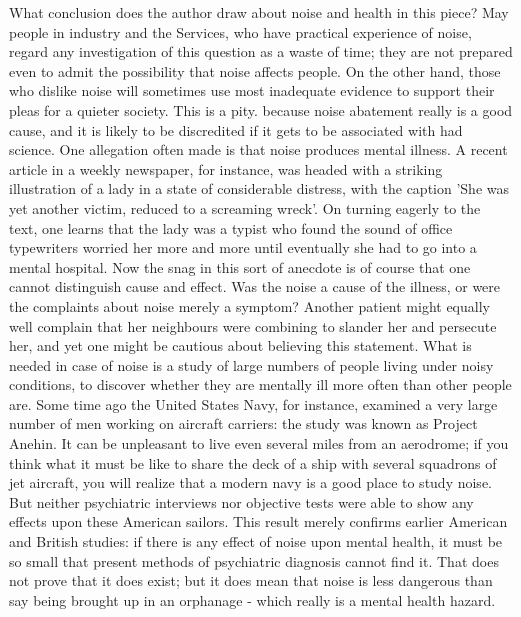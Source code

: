 \begin{enumerate}
What conclusion does the author draw about noise and health in this piece? May people in industry and the Services, who have practical experience of noise, regard any investigation of this question as a waste of time; they are not prepared even to admit the possibility that noise affects people.
 On the other hand, those who dislike noise will sometimes use most inadequate evidence to support their pleas for a quieter society.
 This is a pity. because noise abatement really is a good cause, and it is likely to be discredited if it gets to be associated with had science.
One allegation often made is that noise produces mental illness.
 A recent article in a weekly newspaper, for instance, was headed with a striking illustration of a lady in a state of considerable distress, with the caption 'She was yet another victim, reduced to a screaming wreck'.
 On turning eagerly to the text, one learns that the lady was a typist who found the sound of office typewriters worried her more and more until eventually she had to go into a mental hospital.
 Now the snag in this sort of anecdote is of course that one cannot distinguish cause and effect. Was the noise a cause of the illness, or were the complaints about noise merely a symptom? Another patient might equally well complain that her neighbours were combining to slander her and persecute her, and yet one might be cautious about believing this statement.
What is needed in case of noise is a study of large numbers of people living under noisy conditions, to discover whether they are mentally ill more often than other people are.
 Some time ago the United States Navy, for instance, examined a very large number of men working on aircraft carriers: the study was known as Project Anehin.
 It can be unpleasant to live even several miles from an aerodrome; if you think what it must be like to share the deck of a ship with several squadrons of jet aircraft, you will realize that a modern navy is a good place to study noise.
 But neither psychiatric interviews nor objective tests were able to show any effects upon these American sailors.
 This result merely confirms earlier American and British studies: if there is any effect of noise upon mental health, it must be so small that present methods of psychiatric diagnosis cannot find it.
 That does not prove that it does exist; but it does mean that noise is less dangerous than say being brought up in an orphanage -   which really is a mental health hazard.

\end{enumerate}



